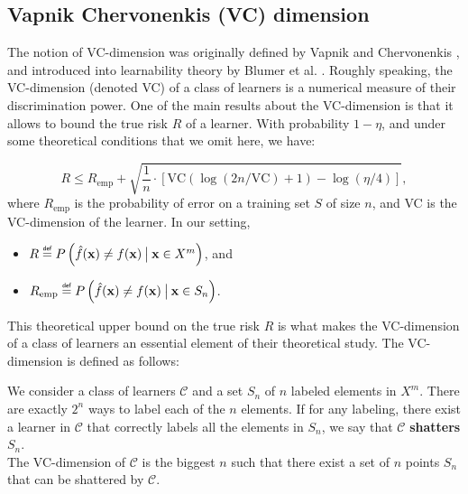 \subsection{Vapnik Chervonenkis (VC) dimension}
\label{SEC:VCdim}
The notion of VC-dimension was originally defined by Vapnik and Chervonenkis
\cite{Vap98}, and introduced into learnability theory by Blumer et al.
\cite{BluEhrHauWarACM89}. Roughly speaking, the VC-dimension (denoted VC) of a class of
learners is a numerical measure of their discrimination power. One of the main
results about the VC-dimension is that it allows to bound the true risk $R$ of
a learner. With probability $1 - \eta$, and under some theoretical conditions
that we omit here, we have:

$$R \leq R_{\text{emp}} + \sqrt{\frac{1}{n} \cdot \left[\text{VC}(\log(2n /
\text{VC}) + 1) - \log(\eta/4)\right]},$$
where $R_\text{emp}$ is the probability of error on a training set $S$ of size
$n$, and VC is the VC-dimension of the learner. In our setting,
\begin{itemize}
  \item $R \eqdef P\left(\hat{f}(\mathbf{x}) \neq f(\mathbf{x}) \given[\big]
    \mathbf{x} \in X^m\right)$, and
  \item $R_\text{emp} \eqdef P\left(\hat{f}(\mathbf{x}) \neq f(\mathbf{x})
    \given[\big] \mathbf{x} \in S_n\right)$.
\end{itemize}

This theoretical upper bound on the true risk $R$ is what makes the
VC-dimension of a class of learners an essential element of their theoretical
study. The VC-dimension is defined as follows:

\begin{definition}[VC-dimension]
  \label{DEF:VCdim}
  We consider a class of learners $\mathcal{C}$ and a set $S_n$ of $n$ labeled
  elements in $X^m$. There are exactly $2^n$ ways to label each of the $n$
  elements. If for any labeling, there exist a learner in $\mathcal{C}$ that
  correctly labels all the elements in $S_n$, we say that $\mathcal{C}$
  \textbf{shatters} $S_n$.\\

  The VC-dimension of $\mathcal{C}$ is the biggest $n$ such that there exist a
  set of $n$ points $S_n$ that can be shattered by $\mathcal{C}$.
\end{definition}

